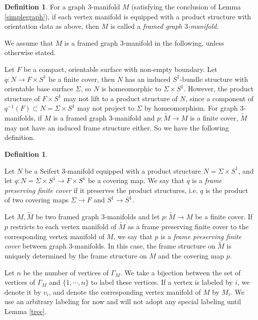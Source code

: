 \documentclass{amsart}
\numberwithin{equation}{section}
\theoremstyle{definition}
\newtheorem{definition}[theorem]{Definition}
\begin{document}
\begin{definition}
For a graph $3$-manifold $M$ (satisfying the conclusion of Lemma \ref{simplegraph}), if each vertex manifold is equipped with a product structure with orientation data as above, then $M$ is called a {\it framed graph $3$-manifold}. 
\end{definition}
We assume that $M$ is a framed graph $3$-manifold in the following, unless otherwise stated.

Let $F$ be a compact, orientable surface with non-empty boundary. Let $q: N\to F\times S^1$ be a finite cover, then $N$ has an induced $S^1$-bundle structure with orientable base surface $\Sigma$, so $N$ is homeomorphic to $\Sigma \times S^1$. However, the product structure of $F\times S^1$ may not lift to a product structure of $N$, since a component of $q^{-1}(F)\subset N=\Sigma\times S^1$ may not project to $\Sigma$ by homeomorphism. For graph $3$-manifolds, if $M$ is a framed graph $3$-manifold and $p:\tilde{M}\to M$ is a finite cover, $\tilde{M}$ may not have an induced frame structure either. So we have the following definition.

\begin{definition}\label{induceframe}

Let $N$ be a Seifert $3$-manifold equipped with a product structure $N=\Sigma\times S^1$, and let $q: N = \Sigma \times S^1\to F\times S^1$ be a covering map. We say that $q$ is a {\it frame preserving finite cover} if it preserves the product structures, i.e. $q$ is the product of two covering maps $\Sigma\to F$ and $S^1\to S^1$.


 Let $M,\tilde{M}$ be two framed graph $3$-manifolds and let $p:\tilde{M}\to M$ be a finite cover. If $p$ restricts to each vertex manifold of $\tilde{M}$ as a frame preserving finite cover to the corresponding vertex manifold of $M$, we say that $p$ is a {\it frame preserving finite cover} between graph $3$-manifolds. In this case, the frame structure on $\tilde{M}$ is uniquely determined by the frame structure on $M$ and the covering map $p$.
\end{definition}

Let $n$ be the number of vertices of $\Gamma_M$. We take a bijection between the set of vertices of $\Gamma_M$ and $\{1,\cdots,n\}$ to label these vertices. If a vertex is labeled by $i$, we denote it by $v_i$, and denote the corresponding vertex manifold of $M$ by $M_i$. We use an arbitrary labeling for now and will not adopt any special labeling until Lemma \ref{tree}.
\end{document}

